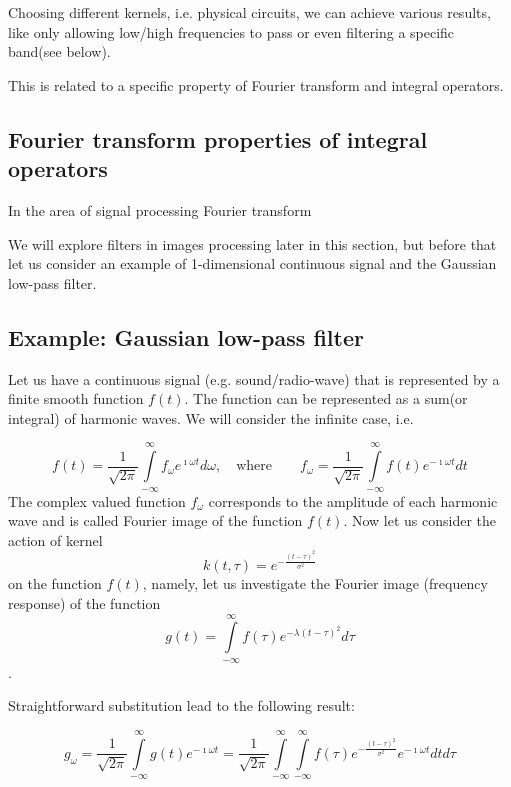 \documentclass[11pt]{book}
\begin{document}
Choosing different kernels, i.e. physical circuits, we can achieve various results, like only allowing low/high frequencies to pass or even filtering a specific band(see below). 

This is related to a specific property of Fourier transform and integral operators.

\subsection{Fourier transform properties of integral operators}

In the area of signal processing Fourier transform

 We will explore filters in images processing later in this section, but before that let us consider an example of 1-dimensional continuous signal and the Gaussian low-pass filter. 

\subsection{Example: Gaussian low-pass filter}

Let us have a continuous signal (e.g. sound/radio-wave) that is represented by a finite smooth function $f(t)$. The function can be represented as a sum(or integral) of harmonic waves. We will consider the infinite case, i.e.

\begin{equation}
f(t) = \frac{1}{\sqrt{2\pi}}\int\limits_{-\infty}^\infty f_{\omega} e^{\imath\omega t} d\omega,\quad \text{where} \qquad f_{\omega} =\frac{1}{\sqrt{2\pi}} \int\limits_{-\infty}^\infty f(t) e^{-\imath\omega t} dt
\end{equation}      
The complex valued function $f_{\omega}$ corresponds to the amplitude of each harmonic wave and is called Fourier image of the function $f(t)$.
Now let us consider the action of kernel 
\begin{equation}
k(t,\tau) = e^{-\frac{(t-\tau)^2}{\sigma^2}}
\end{equation}
 on the function $f(t)$, namely, let us investigate the Fourier image (frequency response) of the function
\begin{equation}
g(t) = \int\limits_{-\infty}^\infty f(\tau)e^{-\lambda(t-\tau)^2} d\tau 
\end{equation}.

Straightforward substitution lead to the following result:

\begin{equation}
g_\omega = \frac{1}{\sqrt{2\pi}} \int\limits_{-\infty}^\infty g(t) e^{-\imath\omega t} = \frac{1}{\sqrt{2\pi}} \int\limits_{-\infty}^\infty \int\limits_{-\infty}^\infty f(\tau)e^{-\frac{(t-\tau)^2}{\sigma^2}} e^{-\imath\omega t }dt d\tau 
\end{equation}
\end{document}
